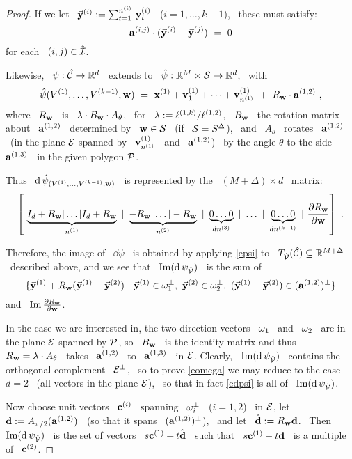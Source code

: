 \begin{proof}
If we let \ $\vec{\mathbf{y}}\sp{({i})}:=\sum_{t=1}^{n\sp{({i})}}\,\mathbf{y}\sp{({i})}_{t}$ \
($i=1,\dotsc,k-1$), \ these must satisfy:
$$
\mathbf{a}\sp{({i,j})}\cdot(\vec{\mathbf{y}}\sp{({i})}-\vec{\mathbf{y}}\sp{({j})})~=~0
$$
%
for each \ $(i,j)\in\hat{\mathcal{I}}$.

Likewise, \ $\psi:\hat{\mathcal{C}}\to{\mathbb R}^{d}$ \ extends to \
$\hat{\psi}:{\mathbb R}^{M}\times\mathcal{S}\to{\mathbb R}^{d}$, \  with
$$
\hat{\psi}(V\sp{({1})},\dotsc,V\sp{({k-1})},\mathbf{w})~=~
\mathbf{x}\sp{({1})}+\mathbf{v}\sp{({1})}_{1}+\dotsb+\mathbf{v}\sp{({1})}_{n\sp{({1})}}~+~R_{\mathbf{w}}\cdot\mathbf{a}\sp{({1,2})}~,
$$
%
where \ $R_{\mathbf{w}}$ \ is \ $\lambda\cdot B_{\mathbf{w}}\cdot A_{\theta}$, \
for \ $\lambda:=\ell\sp{({1,k})}/\ell\sp{({1,2})}$, \ $B_{\mathbf{w}}$ \ the rotation matrix
about \ $\mathbf{a}\sp{({1,2})}$ \ determined by \ $\mathbf{w}\in\mathcal{S}$ \ (if \ $\mathcal{S}=S^{\Delta}$), \
and \ $A_{\theta}$ \ rotates \ $\mathbf{a}\sp{({1,2})}$ \ (in the plane $\mathcal{E}$ spanned by \
$\mathbf{v}\sp{({1})}_{n\sp{({1})}}$ \ and \ $\mathbf{a}\sp{({1,2})}$) \ by the angle $\theta$ to the
side \ $\mathbf{a}\sp{({1,3})}$ \ in the given polygon $\mathcal{P}$.

Thus \ $\operatorname{d}\hat{\psi}_{(V\sp{({1})},\dotsc,V\sp{({k-1})},\mathbf{w})}$ \ is represented
by the \ $(M+\Delta)\times d$ \ matrix:
%
\begin{equation}\label{epsi}
%
\left[~ \underbrace{I_{d}+R_{\bw} | \dotsc | I_{d} + R_{\bw}}_{\nj{1}}~|~
\underbrace{-R_{\bw} | \dotsc | -R_{\bw}}_{\nj{2}}~|~
\underbrace{ 0\dotsc 0 }_{d\nj{3}}~|~\dotsc~|~
\underbrace{ 0\dotsc 0 }_{d\nj{k-1}}~|~
\frac{\partial R_{\bw}}{\partial\bw}\right]~.
%
\end{equation}

Therefore, the image of \ $\dd\psi$ \ is obtained by applying
\eqref{epsi} to \ $T_{\hat{\mathcal{V}}}(\hat{\mathcal{C}})\subseteq{\mathbb R}^{M+\Delta}$ \ described
above, and we see that \ $\operatorname{Im}(\operatorname{d}\psi_{\hat{\mathcal{V}}})$ \ is the sum of
%
\begin{equation}\label{edpsi}
%
\{\vy{1}+ R_{\bw}(\vy{1}-\vy{2})~|\
\vy{1}\in\oj{1}^{\perp},\  \vy{2}\in\oj{2}^{\perp},\
(\vy{1}-\vy{2})\in\ap{2}\}
%
\end{equation}
%
\noindent and \ $\operatorname{Im}\frac{\partial R_{\mathbf{w}}}{\partial\mathbf{w}}$\vsm.

In the case we are interested in, the two direction vectors \ $\mathbf{\omega}_{1}$ \
and \ $\mathbf{\omega}_{2}$ \ are in the plane $\mathcal{E}$ spanned by $\mathcal{P}$, so \
$B_{\mathbf{w}}$ \ is the identity matrix and thus \
$R_{\mathbf{w}}=\lambda\cdot A_{\theta}$ \ takes \ $\mathbf{a}\sp{({1,2})}$ \ to \
$\mathbf{a}\sp{({1,3})}$ \ in $\mathcal{E}$. Clearly, \ $\operatorname{Im}(\operatorname{d}\psi_{\hat{\mathcal{V}}})$ \ contains
the orthogonal complement \ $\mathcal{E}^{\perp}$, \ so to prove
\eqref{eomega} we may reduce to the case \ $d=2$ \ (all vectors
in the plane $\mathcal{E}$), \ so that in fact \eqref{edpsi} is all of \
$\operatorname{Im}(\operatorname{d}\psi_{\hat{\mathcal{V}}})$.

Now choose unit vectors \ $\mathbf{c}\sp{({i})}$ \ spanning \ $\mathbf{\omega}_{i}^{\perp}$ \
($i=1,2$) \ in $\mathcal{E}$, let \ $\mathbf{d}:=A_{\pi/2}(\mathbf{a}\sp{({1,2})})$ \ (so that it
spans \ $(\mathbf{a}\sp{({1,2})})^{\perp}$), \ and let \ $\hat{\mathbf{d}}:=R_{\mathbf{w}}\mathbf{d}$. \
Then \ $\operatorname{Im}(\operatorname{d}\psi_{\hat{\mathcal{V}}})$ \  is the set of
vectors \ $s\mathbf{c}\sp{({1})}+t\hat{\mathbf{d}}$ \ such that \ $s\mathbf{c}\sp{({1})}-t\mathbf{d}$ \ is a
multiple of \ $\mathbf{c}\sp{({2})}$.


\end{proof}
